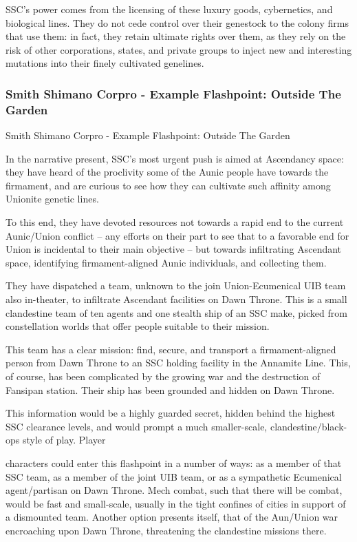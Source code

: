 SSC’s power comes from the licensing of these luxury goods, cybernetics, and biological lines.
They do not cede control over their genestock to the colony firms that use them: in fact, they
retain ultimate rights over them, as they rely on the risk of other corporations, states, and private
groups to inject new and interesting mutations into their finely cultivated genelines.

\subsubsection{Smith Shimano Corpro - Example Flashpoint: Outside The Garden  }
Smith Shimano Corpro - Example Flashpoint: Outside The Garden

In the narrative present, SSC’s most urgent push is aimed at Ascendancy space: they have heard
of the proclivity some of the Aunic people have towards the firmament, and are curious to see
how they can cultivate such affinity among Unionite genetic lines.


To this end, they have devoted resources not towards a rapid end to the current Aunic/Union
conflict -- any efforts on their part to see that to a favorable end for Union is incidental to their
main objective -- but towards infiltrating Ascendant space, identifying firmament-aligned Aunic
individuals, and collecting them.


They have dispatched a team, unknown to the join Union-Ecumenical UIB team also in-theater,
to infiltrate Ascendant facilities on Dawn Throne. This is a small clandestine team of ten agents
and one stealth ship of an SSC make, picked from constellation worlds that offer people suitable
to their mission.


This team has a clear mission: find, secure, and transport a firmament-aligned person from Dawn
Throne to an SSC holding facility in the Annamite Line. This, of course, has been complicated by
the growing war and the destruction of Fansipan station. Their ship has been grounded and
hidden on Dawn Throne.


This information would be a highly guarded secret, hidden behind the highest SSC clearance
levels, and would prompt a much smaller-scale, clandestine/black-ops style of play. Player




characters could enter this flashpoint in a number of ways: as a member of that SSC team, as a
member of the joint UIB team, or as a sympathetic Ecumenical agent/partisan on Dawn Throne.
Mech combat, such that there will be combat, would be fast and small-scale, usually in the tight
confines of cities in support of a dismounted team.  Another option presents itself, that of the
Aun/Union war encroaching upon Dawn Throne, threatening the clandestine missions there.



